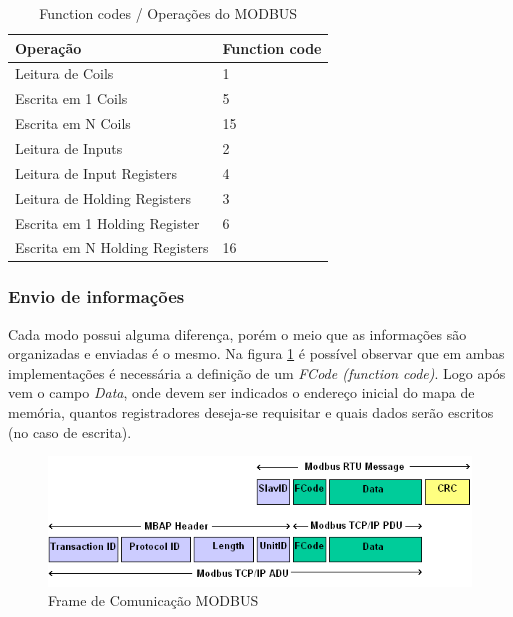         \begin{table}[]
          \centering
          \caption{Function codes / Operações do MODBUS}
          \label{table:modbus-funccodes}
          \begin{tabular}{@{}ll@{}}
            \toprule
            \textbf{Operação}              & \textbf{Function code} \\ \midrule
            Leitura de Coils               & 1                      \\
            Escrita em 1 Coils             & 5                      \\
            Escrita em N Coils             & 15                     \\
            Leitura de Inputs              & 2                      \\
            Leitura de Input Registers     & 4                      \\
            Leitura de Holding Registers   & 3                      \\
            Escrita em 1 Holding Register  & 6                      \\
            Escrita em N Holding Registers & 16                     \\ \bottomrule
          \end{tabular}
        \end{table}

      \subsubsection{Envio de informações}
      \label{methodology:tools:modbus:frame}

        Cada modo possui alguma diferença, porém o meio que as informações são organizadas e enviadas é o mesmo. Na figura \ref{fig:modbus-frame} é possível observar que em ambas implementações é necessária a definição de um \textit{FCode (function code)}. Logo após vem o campo \textit{Data}, onde devem ser indicados o endereço inicial do mapa de memória, quantos registradores deseja-se requisitar e quais dados serão escritos (no caso de escrita).

        \begin{figure}[H]
          \begin{center}
            \includegraphics[width=\textwidth,natwidth=585,natheight=180]{assets/images/modbus-frame.png}
            \caption{Frame de Comunicação MODBUS}
            \label{fig:modbus-frame}
          \end{center}
        \end{figure}

